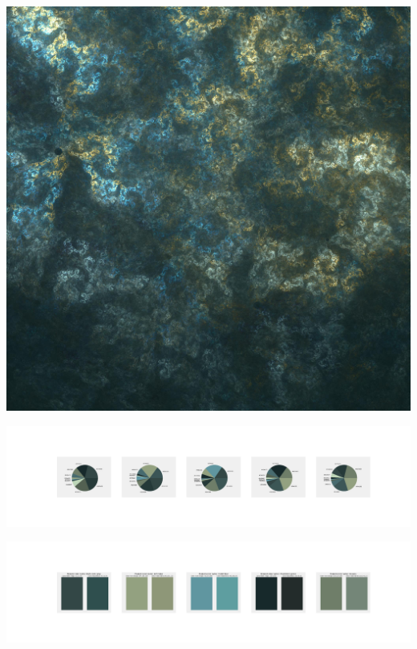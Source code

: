 \documentclass[11pt]{article}
\begin{document}
\begin{landscape}
    \begin{center}
    \includegraphics[width=\textwidth]{./nbimg/file (240).jpg}
    \end{center}

    \begin{center}
    \includegraphics[width=250mm]{./nbimg/pie-157.jpg}
    \end{center}

    \begin{center}
    \includegraphics[width=250mm]{./nbimg/peak-157.jpg}
    \end{center}
    


\end{landscape}
\end{document}
